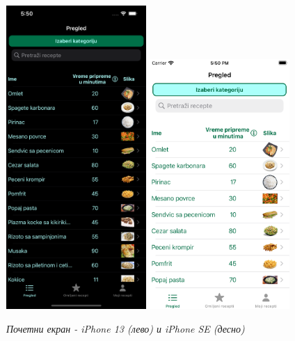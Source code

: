 \documentclass[12pt,oneside]{memoir}
\begin{document}
\begin{figure} [H]
    \centering
    \captionsetup{justification=centering}
    \includegraphics[width=0.475\textwidth]{images/simulators/view images/dark - overview.png} 
    \hfill
    \includegraphics[width=0.475\textwidth]{images/simulators/view images/light - overview.png} 
    \caption{\textit{Почетни екран - iPhone 13 (лево) и iPhone SE (десно)}}
    \label{slika:почетни_екран_1}
\end{figure}
\end{document}

